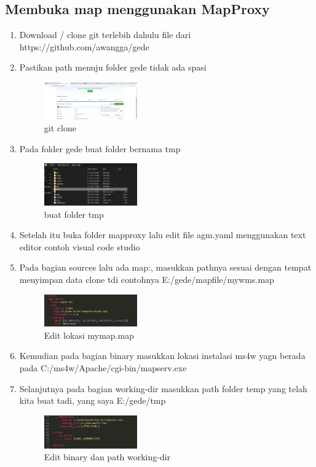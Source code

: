 \subsection{Membuka map menggunakan MapProxy}
\begin{enumerate}
  \item Download / clone git terlebih dahulu file dari https://github.com/awangga/gede
  \item Pastikan path menuju folder gede tidak ada spasi 
  \hfill\break
  \begin{figure}[H]
  \includegraphics[width=4cm]{figures/Tugas4/1174074/12.png}
  \centering
  \caption{git clone}
  \end{figure}
  
  \item Pada folder gede buat folder bernama tmp
  \hfill\break
  \begin{figure}[H]
  \includegraphics[width=4cm]{figures/Tugas4/1174074/13.png}
  \centering
  \caption{buat folder tmp}
  \end{figure}
 
  \item Setelah itu buka folder mapproxy lalu edit file agm.yaml menggunakan text editor contoh visual code studio
  \item Pada bagian sources lalu ada map:, masukkan pathnya sesuai dengan tempat menyimpan data clone tdi contohnya E:/gede/mapfile/mywms.map
  \hfill\break
  \begin{figure}[H]
  \includegraphics[width=4cm]{figures/Tugas4/1174074/14.png}
  \centering
  \caption{Edit lokasi mymap.map}
  \end{figure}


  \item Kemudian pada bagian binary masukkan lokasi instalasi ms4w yagn berada pada C:/ms4w/Apache/cgi-bin/mapserv.exe
  \item Selanjutnya pada bagian working-dir masukkan path folder temp yang telah kita buat tadi, yang saya E:/gede/tmp
  \hfill\break
  \begin{figure}[H]
  \includegraphics[width=4cm]{figures/Tugas4/1174074/15.png}
  \centering
  \caption{Edit binary dan path working-dir}
  \end{figure}


\end{enumerate}
